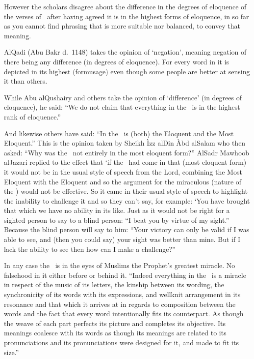 \documentclass[12pt]{memoir}
\begin{document}

However the scholars disagree about the difference in the degrees of eloquence
of the verses of \Quran\ after having agreed it is in the highest forms of
eloquence, in so far as you cannot find phrasing that is more suitable nor
balanced, to convey that meaning.

Al\–Qadi (Abu Bakr d.\ 1148) takes the opinion of ‘negation’, meaning negation
of there being any difference (in degrees of eloquence). For every word in it
is depicted in its highest (form\/usage) even though some people are better at
sensing it than others.

While Abu al\–Qushairy and others take the opinion of ‘difference’ (in degrees
of eloquence), he said: “We do not claim that everything in the \Quran\ is in
the highest rank of eloquence.”

And likewise others have said:
“In the \Quran\ is (both) the Eloquent and the Most Eloquent.”
This is the opinion taken by Sheikh \`Izz al\–Din \`Abd al\–Salam
who then asked: “Why was the \Quran\ not entirely in the most eloquent form?”
Al\–Sadr Mawhoob al\–Jazari replied to the effect that
‘if the \Quran\ had come in that (most eloquent form)
it would not be in the usual style of speech from the Lord,
combining the Most Eloquent with the Eloquent and so the argument
for the miraculous (nature of the \Quran) would not be effective.
So it came in their usual style of speech
to highlight the inability to challenge it and so they can’t say, for example:
‘You have brought that which we have no ability in its like. Just as it would
not be right for a sighted person to say to a blind person: “I beat you by
virtue of my sight.” Because the blind person will say to him: “Your victory
can only be valid if I was able to see, and (then you could say) your sight was
better than mine. But if I lack the ability to see then how can I make a
challenge?”\fnmark


In any case the \Quran\ is in the eyes of Muslims the Prophet’s greatest
miracle. No falsehood in it either before or behind it. “Indeed everything in
the \Quran\ is a miracle in respect of the music of its letters, the kinship
between its wording, the synchronicity of its words with its expressions,
and well\–knit arrangement in its resonance and that which it arrives at in
regards to composition between the words and the fact that every word
intentionally fits its counterpart. As though the weave of each part perfects
its picture and completes its objective. Its meanings coalesce with its
words as though its meanings are related to its pronunciations and its
pronunciations were designed for it, and made to fit its size.”\fnmark
\end{document}
